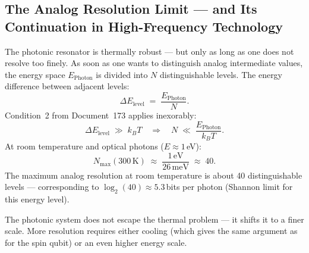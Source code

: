\subsection{The Analog Resolution Limit --- and Its Continuation
  in High-Frequency Technology}
\label{sec:resolution}

The photonic resonator is thermally robust ---
but only as long as one does not resolve too finely.
As soon as one wants to distinguish analog intermediate values,
the energy space $E_\text{Photon}$ is divided into
$N$ distinguishable levels.
The energy difference between adjacent levels:
\begin{equation}
  \Delta E_\text{level} \;=\; \frac{E_\text{Photon}}{N}.
\end{equation}
Condition~2 from Document~173 applies inexorably:
\begin{equation}
  \Delta E_\text{level} \;\gg\; k_BT
  \quad\Longrightarrow\quad
  N \;\ll\; \frac{E_\text{Photon}}{k_BT}.
\end{equation}
At room temperature and optical photons ($E \approx 1$\,eV):
\begin{equation}
  N_\text{max}(300\,\text{K})
  \;\approx\; \frac{1\,\text{eV}}{26\,\text{meV}}
  \;\approx\; 40.
\end{equation}
The maximum analog resolution at room temperature
is about 40 distinguishable levels ---
corresponding to $\log_2(40) \approx 5.3$\,bits
per photon (Shannon limit for this energy level).

The photonic system does not escape the thermal problem
--- it shifts it to a finer scale.
More resolution requires either cooling
(which gives the same argument as for the spin qubit)
or an even higher energy scale.


